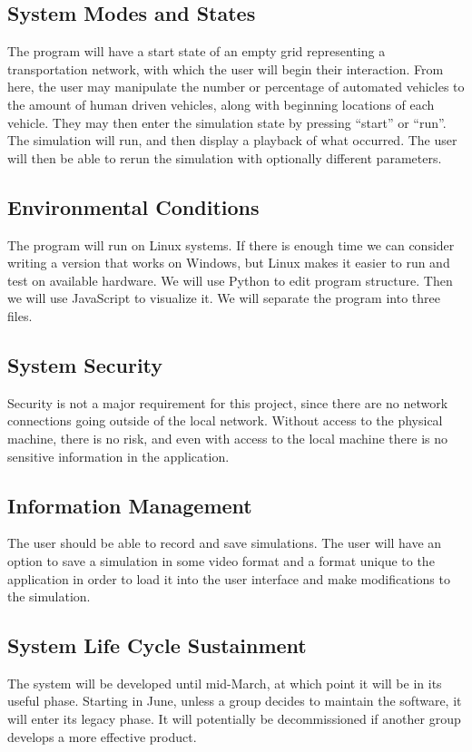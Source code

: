 \documentclass[10pt,letterpaper,draftclsnofoot,onecolumn]{IEEEtran}
\begin{document}
	\subsection{System Modes and States}
	The program will have a start state of an empty grid representing a transportation network, with which the user will begin their interaction. From here, the user may manipulate the number or percentage of automated vehicles to the amount of human driven vehicles, along with beginning locations of each vehicle. They may then enter the simulation state by pressing “start” or “run”. The simulation will run, and then display a playback of what occurred. The user will then be able to rerun the simulation with optionally different parameters.
	\subsection{Environmental Conditions}
	The program will run on Linux systems. If there is enough time we can consider writing a version that works on Windows, but Linux makes it easier to run and test on available hardware. We will use Python to edit program structure. Then we will use JavaScript to visualize it. We will separate the program into three files.
	\subsection{System Security}
	Security is not a major requirement for this project, since there are no network connections going outside of the local network. Without access to the physical machine, there is no risk, and even with access to the local machine there is no sensitive information in the application.
	\subsection{Information Management}
	The user should be able to record and save simulations. The user will have an option to save a simulation in some video format and a format unique to the application in order to load it into the user interface and make modifications to the simulation.
	\subsection{System Life Cycle Sustainment}
	The system will be developed until mid-March, at which point it will be in its useful phase. Starting in June, unless a group decides to maintain the software, it will enter its legacy phase. It will potentially be decommissioned if another group develops a more effective product.
\end{document}
